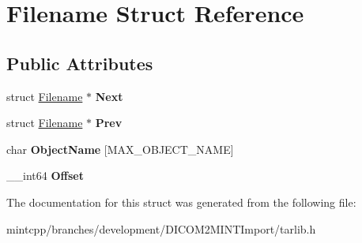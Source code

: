 \hypertarget{struct_filename}{
\section{Filename Struct Reference}
\label{struct_filename}
}
\subsection*{Public Attributes}
\begin{DoxyCompactItemize}
\item 
\hypertarget{struct_filename_a83278f98406267ffb5d4a86a9c596b5b}{
struct \hyperlink{struct_filename}{Filename} $\ast$ {\bfseries Next}}
\label{struct_filename_a83278f98406267ffb5d4a86a9c596b5b}

\item 
\hypertarget{struct_filename_afd845c03c934f110d19c57ceb1dbe877}{
struct \hyperlink{struct_filename}{Filename} $\ast$ {\bfseries Prev}}
\label{struct_filename_afd845c03c934f110d19c57ceb1dbe877}

\item 
\hypertarget{struct_filename_a830461a9d8a6b67c0567e8825c004ae9}{
char {\bfseries ObjectName} \mbox{[}MAX\_\-OBJECT\_\-NAME\mbox{]}}
\label{struct_filename_a830461a9d8a6b67c0567e8825c004ae9}

\item 
\hypertarget{struct_filename_a4991f4017326a8006af06c910350b28e}{
\_\-\_\-int64 {\bfseries Offset}}
\label{struct_filename_a4991f4017326a8006af06c910350b28e}

\end{DoxyCompactItemize}


The documentation for this struct was generated from the following file:\begin{DoxyCompactItemize}
\item 
mintcpp/branches/development/DICOM2MINTImport/tarlib.h\end{DoxyCompactItemize}
